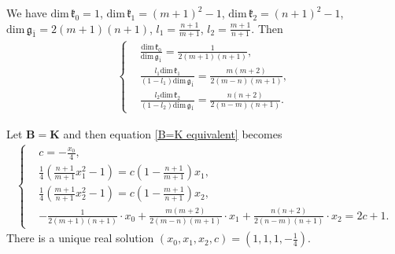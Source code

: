 \documentclass[reqno]{amsart}
\theoremstyle{definition}
\begin{document}
  We have
  $\mathrm{dim}\,\mathfrak{k}_{0}=1$, $\mathrm{dim}\,\mathfrak{k}_{1}=(m+1)^{2}-1$, $\mathrm{dim}\,\mathfrak{k}_{2}=(n+1)^{2}-1$, $\mathrm{dim}\,\mathfrak{g}_{\bar{1}}=2(m+1)(n+1)$, $l_{1}=\frac{n+1}{m+1}$, $l_{2}=\frac{m+1}{n+1}$.
Then
\begin{eqnarray*}
\left\{
\begin{aligned}
&\frac{\mathrm{dim}\,\mathfrak{k}_{0}}{\mathrm{dim}\,\mathfrak{g}_{\bar{1}}}=\frac{1}{2(m+1)(n+1)},\\
&\frac{l_{1}\mathrm{dim}\,\mathfrak{k}_{1}}{(1-l_{1})\mathrm{dim}\,\mathfrak{g}_{\bar{1}}}=\frac{m(m+2)}{2(m-n)(m+1)},\\
&\frac{l_{2}\mathrm{dim}\,\mathfrak{k}_{2}}{(1-l_{2})\mathrm{dim}\,\mathfrak{g}_{\bar{1}}}=\frac{n(n+2)}{2(n-m)(n+1)}.
\end{aligned}
\right.
\end{eqnarray*}

Let $\mathbf{B}=\mathbf{K}$ and then equation \eqref{B=K equivalent} becomes
\begin{eqnarray*}
\left\{
\begin{aligned}
&c=-\frac{x_{0}}{4},\\
&\frac{1}{4}\left(\frac{n+1}{m+1}x_{1}^{2}-1\right)=c\left(1-\frac{n+1}{m+1}\right)x_{1},\\
&\frac{1}{4}\left(\frac{m+1}{n+1}x_{2}^{2}-1\right)=c\left(1-\frac{m+1}{n+1}\right)x_{2},\\
&-\frac{1}{2(m+1)(n+1)}\cdot x_{0}+\frac{m(m+2)}{2(m-n)(m+1)}\cdot x_{1}+\frac{n(n+2)}{2(n-m)(n+1)}\cdot x_{2}=2c+1.
\end{aligned}\right.
\end{eqnarray*}
There is a unique real solution $(x_{0},x_{1},x_{2},c)=\left(1,1,1,-\frac{1}{4}\right)$.
\end{document}
